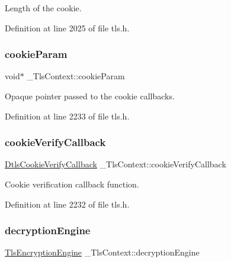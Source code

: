 Length of the cookie. 



Definition at line 2025 of file tls.\+h.

\mbox{\label{struct__TlsContext_aff208350d3c85b84a63b542b4a5dc057}} 
\subsubsection{\texorpdfstring{cookie\+Param}{cookieParam}}
{\footnotesize\ttfamily void$\ast$ \+\_\+\+Tls\+Context\+::cookie\+Param}



Opaque pointer passed to the cookie callbacks. 



Definition at line 2233 of file tls.\+h.

\mbox{\label{struct__TlsContext_a5e2fc5800b052286bd151bee2850c5e8}} 
\subsubsection{\texorpdfstring{cookie\+Verify\+Callback}{cookieVerifyCallback}}
{\footnotesize\ttfamily \hyperlink{dtls__misc_8h_ad815ff6a1d5fa9f07fde4475168c6538}{Dtls\+Cookie\+Verify\+Callback} \+\_\+\+Tls\+Context\+::cookie\+Verify\+Callback}



Cookie verification callback function. 



Definition at line 2232 of file tls.\+h.

\mbox{\label{struct__TlsContext_ad61f179ec1cbeb1543aee9487b63e7c4}} 
\subsubsection{\texorpdfstring{decryption\+Engine}{decryptionEngine}}
{\footnotesize\ttfamily \hyperlink{structTlsEncryptionEngine}{Tls\+Encryption\+Engine} \+\_\+\+Tls\+Context\+::decryption\+Engine}



